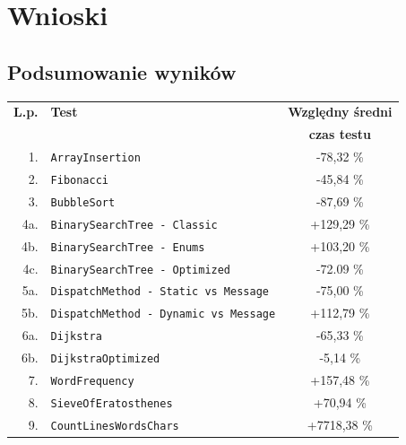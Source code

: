 \documentclass[mgr, shortabstract]{iithesis}
\begin{document}
\chapter{Wnioski}

\section{Podsumowanie wyników}

\begin{table}[!ht]
    \begin{tabularx}{1.0\textwidth}{ rXc } 
        \hline
        \textbf{L.p.} & \textbf{Test}  & \textbf{Względny średni} \\
                        &                & \textbf{czas testu} \\
        \hline
        1. & \texttt{ArrayInsertion}                         & \textcolor{MTGreen}{-78,32 \%}    \\ 
        2. & \texttt{Fibonacci}                              & \textcolor{MTGreen}{-45,84 \%}    \\ 
        3. & \texttt{BubbleSort}                             & \textcolor{MTGreen}{-87,69 \%}    \\ 
        4a. & \texttt{BinarySearchTree - Classic }            & \textcolor{MTRed}{+129,29 \%}     \\ 
        4b. & \texttt{BinarySearchTree - Enums }              & \textcolor{MTRed}{+103,20 \%}     \\ 
        4c. & \texttt{BinarySearchTree - Optimized}           & \textcolor{MTGreen}{-72.09 \%}    \\ 
        5a. & \texttt{DispatchMethod - Static vs Message}     & \textcolor{MTGreen}{-75,00 \%}    \\ 
        5b. & \texttt{DispatchMethod - Dynamic vs Message}    & \textcolor{MTRed}{+112,79 \%}     \\ 
        6a. & \texttt{Dijkstra}                               & \textcolor{MTGreen}{-65,33 \%}    \\ 
        6b. & \texttt{DijkstraOptimized}                      & \textcolor{MTGreen}{-5,14 \%}     \\ 
        7. & \texttt{WordFrequency}                          & \textcolor{MTRed}{+157,48 \%}     \\ 
        8. & \texttt{SieveOfEratosthenes}                    & \textcolor{MTRed}{+70,94 \%}      \\ 
        9. & \texttt{CountLinesWordsChars}                   & \textcolor{MTRed}{+7718,38 \%}    \\ 

\end{tabularx}
\end{table}
\end{document}

